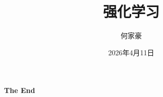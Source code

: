 \documentclass[aspectratio=169,xcolor=dvipsnames]{beamer}
\title{强化学习}
\author{何家豪}
\institute
{
    hejiahao@ruc.edu.cn \\
    中国人民大学信息学院
}
\date{2026年4月11日}
\begin{document}
\begin{frame}
    \titlepage
\end{frame}









\begin{frame}
    \Huge{\centerline{\textbf{The End}}}
\end{frame}
\end{document}
